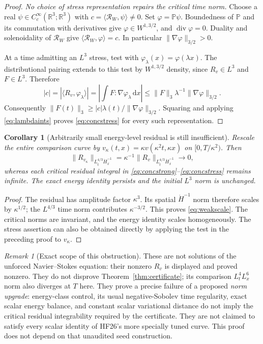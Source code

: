 \documentclass[11pt,a4paper]{article}
\newtheorem{corollary}[theorem]{Corollary}
\theoremstyle{definition}\newtheorem{definition}[theorem]{Definition}
\theoremstyle{remark}\newtheorem{remark}[theorem]{Remark}
\newcommand{\R}{\mathbb R}
\newcommand{\PP}{\mathbb P}
\newcommand{\dd}{\,\mathrm d}
\newcommand{\norm}[1]{\lVert #1\rVert}
\newcommand{\ip}[2]{\langle #1,#2\rangle}
\newcommand{\diver}{\operatorname{div}}
\numberwithin{equation}{section}
\begin{document}
\begin{proof}
\emph{No choice of stress representation repairs the critical time norm.}
Choose a real $\psi\in C_c^\infty(\R^3;\R^3)$ with $c=\ip{\mathcal R_W}{\psi}\ne0$. Set $\varphi=\PP\psi$. Boundedness of $\PP$ and its commutation with derivatives give $\varphi\in W^{1,3/2}$, and $\diver\varphi=0$. Duality and solenoidality of $\mathcal R_W$ give $\ip{\mathcal R_W}{\varphi}=c$. In particular $\norm{\nabla\varphi}_{3/2}>0$.

At a time admitting an $L^3$ stress, test with $\varphi_\lambda(x)=\varphi(\lambda x)$. The distributional pairing extends to this test by $W^{1,3/2}$ density, since $R_v\in L^3$ and $F\in L^3$. Therefore
\[
 |c|=|\ip{R_v}{\varphi_\lambda}|
 =\left|\int F:\nabla\varphi_\lambda\dd x\right|
 \le\norm F_3\lambda^{-1}\norm{\nabla\varphi}_{3/2}.
\]
Consequently $\norm{F(t)}_3\ge |c|\lambda(t)/\norm{\nabla\varphi}_{3/2}$. Squaring and applying \eqref{eq:lambdaints} proves \eqref{eq:concstress} for every such representation.
\end{proof}

\begin{corollary}[Arbitrarily small energy-level residual is still insufficient]\label{cor:weaksmall}
Rescale the entire comparison curve by
$v_\kappa(t,x)=\kappa v(\kappa^2t,\kappa x)$ on $[0,T/\kappa^2)$. Then
\begin{equation}\label{eq:weakscale}
 \norm{R_{v_\kappa}}_{L^{4/3}_t\dot H^{-1}_x}
 =\kappa^{-1}\norm{R_v}_{L^{4/3}_t\dot H^{-1}_x}\longrightarrow0,
\end{equation}
whereas each critical residual integral in \eqref{eq:concstrong}--\eqref{eq:concstress} remains infinite. The exact energy identity persists and the initial $L^3$ norm is unchanged.
\end{corollary}
\begin{proof}
The residual has amplitude factor $\kappa^3$. Its spatial $\dot H^{-1}$ norm therefore scales by $\kappa^{1/2}$; the $L^{4/3}$ time norm contributes $\kappa^{-3/2}$. This proves \eqref{eq:weakscale}. The critical norms are invariant, and the energy identity scales homogeneously. The stress assertion can also be obtained directly by applying the test in the preceding proof to $v_\kappa$.
\end{proof}

\begin{remark}[Exact scope of this obstruction]
These are not solutions of the unforced Navier--Stokes equation: their nonzero $R_v$ is displayed and proved nonzero. They do not disprove Theorem~\ref{thm:certificate}; its comparison $L^4_tL^6_x$ norm also diverges at $T$ here. They prove a precise failure of a proposed \emph{norm upgrade}: energy-class control, its usual negative-Sobolev time regularity, exact scalar energy balance, and constant scalar variational distance do not imply the critical residual integrability required by the certificate. They are not claimed to satisfy every scalar identity of HF26's more specially tuned curve. This proof does not depend on that unaudited seed construction.
\end{remark}
\end{document}
